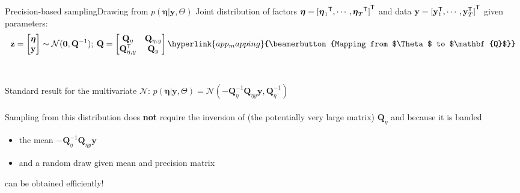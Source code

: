 \documentclass[xcolor=svgnames, 10pt, aspectratio=169]{beamer}
\newcommand\transpose[1]{{#1}^{\sf{T}}}
\begin{document}
\begin{frame}[fragile]{Precision-based sampling}{Drawing from $p(\boldsymbol{\eta} | \mathbf{y}, \Theta)$}
    \label{precsampl_draw_eta}
    Joint distribution of factors $\boldsymbol{\eta} = \transpose{[\transpose{\boldsymbol{\eta}_1}, \cdots, \transpose{\boldsymbol{\eta}_T}]}$ and data $\mathbf{y} = \transpose{[\transpose{\mathbf{y}}_1, \cdots, \transpose{\mathbf{y}}_T]}$ given parameters: 
    $$
            \mathbf{z} =
            \begin{bmatrix}
                \boldsymbol{\eta} \\ 
                \mathbf{y}
            \end{bmatrix}     
            \sim        
            \mathcal{N}(\mathbf{0}, \mathbf{Q}^{-1})
            ; \: \mathbf{Q} = 
            \begin{bmatrix}
                \mathbf{Q}_{\eta} & \mathbf{Q}_{\eta, y} \\
                \transpose{\mathbf{Q}}_{\eta, y} & \mathbf{Q}_{y}
            \end{bmatrix}   
            \hyperlink{app_mapping}{\beamerbutton{Mapping from $\Theta$ to $\mathbf{Q}$}} 
    $$ \\~\\    
    
    Standard result for the multivariate $\mathcal{N}$: $p(\boldsymbol{\eta} | \mathbf{y}, \Theta) = \mathcal{N}(-\mathbf{Q}_{\eta}^{-1} \mathbf{Q}_{\eta y} \mathbf{y}, \mathbf{Q}_{\eta}^{-1})$\\~\\

    Sampling from this distribution does \textbf{not} require the inversion of (the potentially very large matrix) $\mathbf{Q}_{\eta}$ and because it is banded 
    \vspace{0.2cm}
    \begin{itemize}
        \item the mean $-\mathbf{Q}_{\eta}^{-1} \mathbf{Q}_{\eta y} \mathbf{y}$ 
        \item and a random draw given mean and precision matrix 
    \end{itemize}
    \vspace{0.2cm}
    can be obtained efficiently! \hyperlink{app_rueheld_algs}{}
    
\end{frame}
\end{document}
